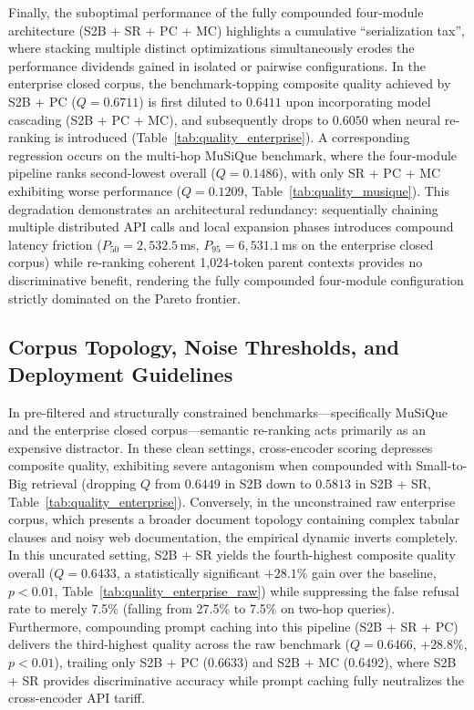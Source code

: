 Finally, the suboptimal performance of the fully compounded four-module architecture (S2B + SR + PC + MC) highlights a cumulative ``serialization tax'', where stacking multiple distinct optimizations simultaneously erodes the performance dividends gained in isolated or pairwise configurations. In the enterprise closed corpus, the benchmark-topping composite quality achieved by S2B + PC ($Q = 0.6711$) is first diluted to $0.6411$ upon incorporating model cascading (S2B + PC + MC), and subsequently drops to $0.6050$ when neural re-ranking is introduced (Table~\ref{tab:quality_enterprise}). A corresponding regression occurs on the multi-hop MuSiQue benchmark, where the four-module pipeline ranks second-lowest overall ($Q = 0.1486$), with only SR + PC + MC exhibiting worse performance ($Q = 0.1209$, Table~\ref{tab:quality_musique}). This degradation demonstrates an architectural redundancy: sequentially chaining multiple distributed API calls and local expansion phases introduces compound latency friction ($P_{50} = 2{,}532.5$\,ms, $P_{95} = 6{,}531.1$\,ms on the enterprise closed corpus) while re-ranking coherent 1,024-token parent contexts provides no discriminative benefit, rendering the fully compounded four-module configuration strictly dominated on the Pareto frontier.

\subsection{Corpus Topology, Noise Thresholds, and Deployment Guidelines}
\label{subsec:disc_corpus_topology}

In pre-filtered and structurally constrained benchmarks---specifically MuSiQue and the enterprise closed corpus---semantic re-ranking acts primarily as an expensive distractor. In these clean settings, cross-encoder scoring depresses composite quality, exhibiting severe antagonism when compounded with Small-to-Big retrieval (dropping $Q$ from $0.6449$ in S2B down to $0.5813$ in S2B + SR, Table~\ref{tab:quality_enterprise}). Conversely, in the unconstrained raw enterprise corpus, which presents a broader document topology containing complex tabular clauses and noisy web documentation, the empirical dynamic inverts completely. In this uncurated setting, S2B + SR yields the fourth-highest composite quality overall ($Q = 0.6433$, a statistically significant $+28.1\%$ gain over the baseline, $p < 0.01$, Table~\ref{tab:quality_enterprise_raw}) while suppressing the false refusal rate to merely 7.5\% (falling from 27.5\% to 7.5\% on two-hop queries). Furthermore, compounding prompt caching into this pipeline (S2B + SR + PC) delivers the third-highest quality across the raw benchmark ($Q = 0.6466$, $+28.8\%$, $p < 0.01$), trailing only S2B + PC ($0.6633$) and S2B + MC ($0.6492$), where S2B + SR provides discriminative accuracy while prompt caching fully neutralizes the cross-encoder API tariff.

